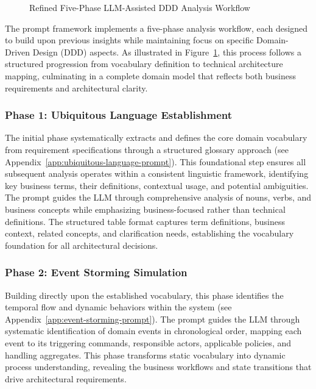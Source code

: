 \begin{figure}[H]
    \caption{Refined Five-Phase LLM-Assisted DDD Analysis Workflow}
    \label{fig:refined-ddd-workflow}
    \end{figure}

The prompt framework implements a five-phase analysis workflow, each designed to build upon previous insights while maintaining focus on specific Domain-Driven Design (DDD) aspects. As illustrated in Figure~\ref{fig:refined-ddd-workflow}, this process follows a structured progression from vocabulary definition to technical architecture mapping, culminating in a complete domain model that reflects both business requirements and architectural clarity.

\subsubsection{Phase 1: Ubiquitous Language Establishment}
The initial phase systematically extracts and defines the core domain vocabulary from requirement specifications through a structured glossary approach (see Appendix~\ref{app:ubiquitous-language-prompt}). This foundational step ensures all subsequent analysis operates within a consistent linguistic framework, identifying key business terms, their definitions, contextual usage, and potential ambiguities. The prompt guides the LLM through comprehensive analysis of nouns, verbs, and business concepts while emphasizing business-focused rather than technical definitions. The structured table format captures term definitions, business context, related concepts, and clarification needs, establishing the vocabulary foundation for all architectural decisions.

\subsubsection{Phase 2: Event Storming Simulation}
Building directly upon the established vocabulary, this phase identifies the temporal flow and dynamic behaviors within the system (see Appendix~\ref{app:event-storming-prompt}). The prompt guides the LLM through systematic identification of domain events in chronological order, mapping each event to its triggering commands, responsible actors, applicable policies, and handling aggregates. This phase transforms static vocabulary into dynamic process understanding, revealing the business workflows and state transitions that drive architectural requirements.

